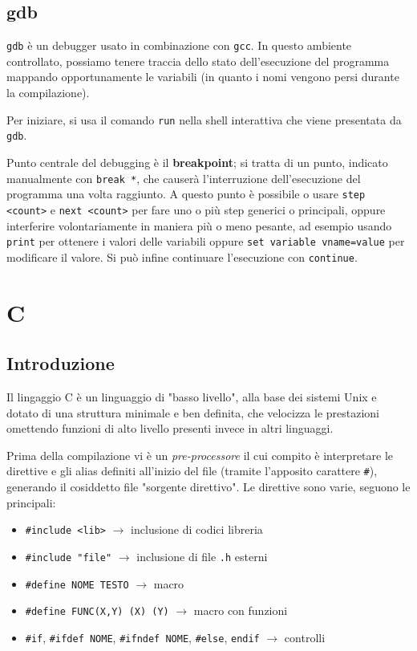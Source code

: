 \documentclass[11pt]{article}
\begin{document}
\subsection{gdb}

\verb|gdb| è un debugger usato in combinazione con \verb|gcc|. In questo ambiente controllato, possiamo tenere traccia dello stato dell'esecuzione del programma mappando opportunamente le variabili (in quanto i nomi vengono persi durante la compilazione).

Per iniziare, si usa il comando \verb|run| nella shell interattiva che viene presentata da \verb|gdb|.

Punto centrale del debugging è il \textbf{breakpoint}; si tratta di un punto, indicato manualmente con \verb|break *|, che causerà l'interruzione dell'esecuzione del programma una volta raggiunto. A questo punto è possibile o usare \verb|step <count>| e \verb|next <count>| per fare uno o più step generici o principali, oppure interferire volontariamente in maniera più o meno pesante, ad esempio usando \verb|print| per ottenere i valori delle variabili oppure \verb|set variable vname=value| per modificare il valore. Si può infine continuare l'esecuzione con \verb|continue|.

\section{C}

\subsection{Introduzione}

Il lingaggio C è un linguaggio di "basso livello", alla base dei sistemi Unix e dotato di una struttura minimale e ben definita, che velocizza le prestazioni omettendo funzioni di alto livello presenti invece in altri linguaggi.

Prima della compilazione vi è un \textit{pre-processore} il cui compito è interpretare le direttive e gli alias definiti all'inizio del file (tramite l'apposito carattere \verb|#|), generando il cosiddetto file "sorgente direttivo". Le direttive sono varie, seguono le principali:

\begin{itemize}
    \item\verb|#include <lib>| $\rightarrow$ inclusione di codici libreria
    \item\verb|#include "file"| $\rightarrow$ inclusione di file \verb|.h| esterni
    \item\verb|#define NOME TESTO| $\rightarrow$ macro
    \item\verb|#define FUNC(X,Y) (X) (Y)| $\rightarrow$ macro con funzioni
    \item\verb|#if|, \verb|#ifdef NOME|, \verb|#ifndef NOME|, \verb|#else|, \verb|endif| $\rightarrow$ controlli
\end{itemize}
\end{document}
